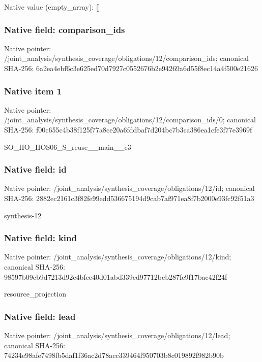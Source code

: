 \documentclass[10pt,a4paper]{article}
\begin{document}
Native value (empty\_\allowbreak{}array): []

\subsubsection{Native field: comparison\_\allowbreak{}ids}
Native pointer: /joint\_\allowbreak{}analysis/synthesis\_\allowbreak{}coverage/obligations/12/comparison\_\allowbreak{}ids; canonical SHA-256: 6a2ea4ebf6c3e625ed70d7927c0552676b2e94269a6d55f8ec14a4f500e21626

\subsubsection{Native item 1}
Native pointer: /joint\_\allowbreak{}analysis/synthesis\_\allowbreak{}coverage/obligations/12/comparison\_\allowbreak{}ids/0; canonical SHA-256: f00c655c4b38f125f77a8ce20a6fddbaf7d204bc7b3ca386ea1cfe3f77e3969f

\begingroup\raggedright\sloppy SO\_\allowbreak{}HO\_\allowbreak{}HOS06\_\allowbreak{}S\_\allowbreak{}reuse\_\allowbreak{}\_\allowbreak{}main\_\allowbreak{}\_\allowbreak{}c3\par\endgroup

\subsubsection{Native field: id}
Native pointer: /joint\_\allowbreak{}analysis/synthesis\_\allowbreak{}coverage/obligations/12/id; canonical SHA-256: 2882ec2161c3f82fe99edd536675194d9cab7af971ea8f7b2000e93fc92f51a3

\begingroup\raggedright\sloppy synthesis-12\par\endgroup

\subsubsection{Native field: kind}
Native pointer: /joint\_\allowbreak{}analysis/synthesis\_\allowbreak{}coverage/obligations/12/kind; canonical SHA-256: 98597b09cb9d7213d92c4bfee40d01abd339cd97712bcb287fe9f17bac42f24f

\begingroup\raggedright\sloppy resource\_\allowbreak{}projection\par\endgroup

\subsubsection{Native field: lead}
Native pointer: /joint\_\allowbreak{}analysis/synthesis\_\allowbreak{}coverage/obligations/12/lead; canonical SHA-256: 74234e98afe7498fb5daf1f36ac2d78acc339464f950703b8c019892f982b90b
\end{document}
